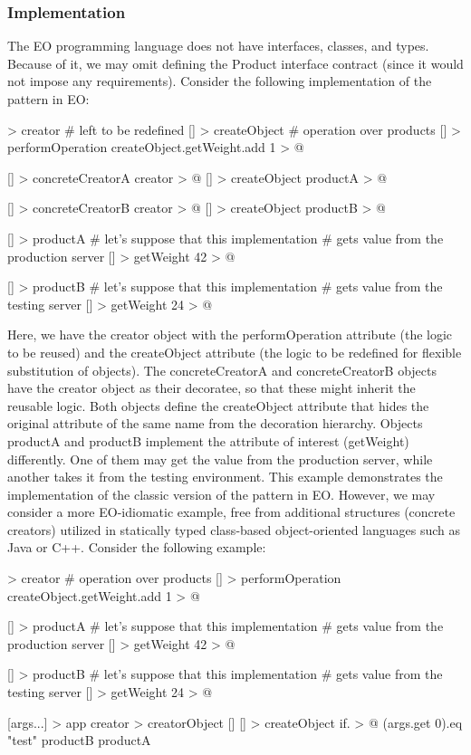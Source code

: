 \documentclass[12pt]{book}
\begin{document}
\subsubsection{Implementation}
The EO programming language does not have interfaces, classes, and types. Because of it, we may omit defining the Product interface contract (since it would not impose any requirements). Consider the following implementation of the pattern in EO: 

\begin{ffcode}
[] > creator
  # left to be redefined
  [] > createObject
  # operation over products
  [] > performOperation
    createObject.getWeight.add 1 > @

[] > concreteCreatorA
  creator > @
  [] > createObject
    productA > @

[] > concreteCreatorB
  creator > @
  [] > createObject
    productB > @

[] > productA
  # let's suppose that this implementation
  # gets value from the production server
  [] > getWeight
    42 > @

[] > productB
  # let's suppose that this implementation
  # gets value from the testing server
  [] > getWeight
          24 > @

\end{ffcode}

Here, we have the creator object with the performOperation attribute (the logic to be reused) and the createObject attribute (the logic to be redefined for flexible substitution of objects). The concreteCreatorA and concreteCreatorB objects have the creator object as their decoratee, so that these might inherit the reusable logic. Both objects define the createObject attribute that hides the original attribute of the same name from the decoration hierarchy. Objects productA and productB implement the attribute of interest (getWeight) differently. One of them may get the value from the production server, while another takes it from the testing environment. This example demonstrates the implementation of the classic version of the pattern in EO. However, we may consider a more EO-idiomatic example, free from additional structures (concrete creators) utilized in statically typed class-based object-oriented languages such as Java or C++. Consider the following example: 

\begin{ffcode}
[@] > creator
  # operation over products
  [] > performOperation
    createObject.getWeight.add 1 > @

[] > productA
  # let's suppose that this implementation
  # gets value from the production server
  [] > getWeight
    42 > @

[] > productB
  # let's suppose that this implementation
  # gets value from the testing server
  [] > getWeight
    24 > @

[args...] > app
  creator > creatorObject
    []
      [] > createObject
        if. > @
          (args.get 0).eq "test"
          productB
          productA

\end{ffcode}
\end{document}

